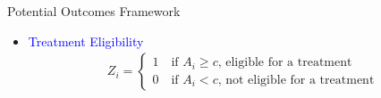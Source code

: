 \documentclass[hyperref={pdfpagelabels=false}]{beamer}
\begin{document}
\begin{frame}{Potential Outcomes Framework}
	\begin{itemize}
		
		\item \textcolor{blue}{Treatment Eligibility}
		\begin{align*}
			Z_{i}=\left\lbrace
			\begin{array}{l}
				1\quad \text{if $A_i\geq c$, eligible for a treatment}\\
				0\quad \text{if $A_i< c$, not eligible for a treatment}
			\end{array}\right.
		\end{align*}
		
	\end{itemize}
\end{frame}
\end{document}

